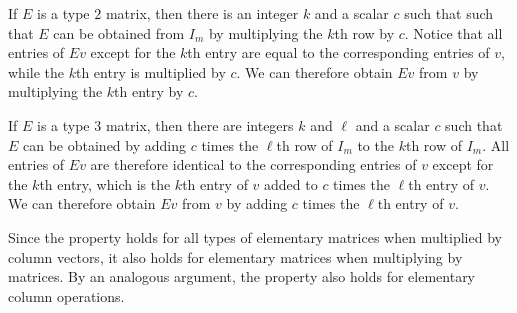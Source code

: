If $E$ is a type $2$ matrix,
then there is an integer $k$ and a scalar $c$ such that
such that $E$ can be obtained from $I_m$ by multiplying
the $k$th row by $c$.
Notice that all entries of $Ev$ except for the $k$th entry
are equal to the corresponding entries of $v$,
while the $k$th entry is multiplied by $c$.
We can therefore obtain $Ev$ from $v$
by multiplying the $k$th entry by $c$.

If $E$ is a type $3$ matrix,
then there are integers $k$ and $\ell$ and a scalar $c$ such that
$E$ can be obtained by adding $c$ times the $\ell$th row of $I_m$
to the $k$th row of $I_m$.
All entries of $Ev$ are therefore identical to the corresponding entries
of $v$ except for the $k$th entry,
which is the $k$th entry of $v$ added to $c$ times the $\ell$th entry of $v$.
We can therefore obtain $Ev$ from $v$ by
adding $c$ times the $\ell$th entry of $v$.

Since the property holds for all types of elementary matrices
when multiplied by column vectors,
it also holds for elementary matrices when multiplying by matrices.
By an analogous argument,
the property also holds for elementary column operations.
\bye
